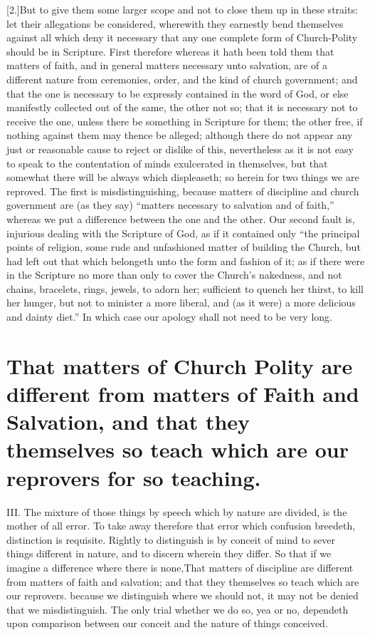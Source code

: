 [2.]But to give them some larger scope and not to close them up in these straits: let their allegations be considered, wherewith they earnestly bend themselves against all which deny it necessary that any one complete form of Church-Polity should be in Scripture. First therefore whereas it hath been told them that matters of faith, and in general matters necessary unto salvation, are of a different nature from ceremonies, order, and the kind of church government; and that the one is necessary to be expressly contained in the word of God, or else manifestly collected out of the same, the other not so; that it is necessary not to receive the one, unless there be something in Scripture for them; the other free, if nothing against them may thence be alleged; although there do not appear any just or reasonable cause to reject  or dislike of this, nevertheless as it is not easy to speak to the contentation of minds exulcerated in themselves, but that somewhat there will be always which displeaseth; so herein for two things we are reproved. The first is misdistinguishing, because matters of discipline and church government are (as they say) “matters necessary to salvation and of faith,” whereas we put a difference between the one and the other. Our second fault is, injurious dealing with the Scripture of God, as if it contained only “the principal points of religion, some rude and unfashioned matter of building the Church, but had left out that which belongeth unto the form and fashion of it; as if there were in the Scripture no more than only to cover the Church’s nakedness, and not chains, bracelets, rings, jewels, to adorn her; sufficient to quench her thirst, to kill her hunger, but not to minister a more liberal, and (as it were) a more delicious and dainty diet.” In which case our apology shall not need to be very long.

\section*{That matters of Church Polity are different from matters of Faith and Salvation, and that they themselves so teach which are our reprovers for so teaching.}

III. The mixture of those things by speech which by nature are divided, is the mother of all error. To take away therefore that error which confusion breedeth, distinction is requisite. Rightly to distinguish is by conceit of mind to sever things different in nature, and to discern wherein they differ. So that if we imagine a difference where there is none,That matters of discipline are different from matters of faith and salvation; and that they themselves so teach which are our reprovers. because we distinguish where we should not, it may not be denied that we misdistinguish. The only trial whether we do so, yea or no, dependeth upon comparison between our conceit and the nature of things conceived.


